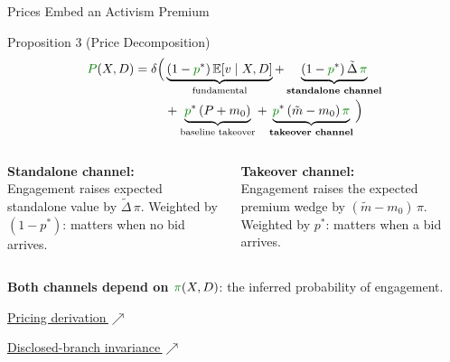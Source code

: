 \documentclass[aspectratio=169,10pt]{beamer}
\newcommand{\E}{\mathbb{E}}
\newcommand{\1}{\mathbf{1}}
\newcommand{\outcome}[1]{\textcolor{green!50!black}{#1}}
\newcommand{\backuplink}[2]{%
  \hfill{\scriptsize\hyperlink{#1}{\textcolor{brightblue}{#2\,$\nearrow$}}}%
}
\begin{document}
\begin{frame}{Prices Embed an Activism Premium}
\hypertarget{main:prop3}{}
\small
\begin{block}{Proposition 3 (Price Decomposition)}
\vspace{-0.4em}
\begin{align*}
\outcome{P}(X,D) = \delta\Big(&\underbrace{(1-\outcome{p}^*)\,\E[v\mid X,D]}_{\text{fundamental}}
+ \underbrace{(1-\outcome{p}^*)\,\tilde{\Delta}\,\outcome{\pi}}_{\text{\textbf{standalone channel}}}\\
&+ \underbrace{\outcome{p}^*\,(P + m_0)}_{\text{baseline takeover}}
+ \underbrace{\outcome{p}^*\,(\tilde{m} - m_0)\,\outcome{\pi}}_{\text{\textbf{takeover channel}}}\Big)
\end{align*}
\end{block}

\begin{columns}[T,onlytextwidth]
\textbf{Standalone channel:}\\
Engagement raises expected standalone value by $\tilde{\Delta}\,\pi$.
Weighted by $(1-p^*)$: matters when no bid arrives.

\textbf{Takeover channel:}\\
Engagement raises the expected premium wedge by $(\tilde{m} - m_0)\,\pi$.
Weighted by $p^*$: matters when a bid arrives.
\end{columns}

\vspace{0.2em}
\textbf{Both channels depend on $\outcome{\pi}(X,D)$}: the inferred probability of engagement.

\backuplink{backup:fixed_point}{Pricing derivation}
\backuplink{backup:disclosed_invariance}{Disclosed-branch invariance}
\end{frame}
\end{document}
